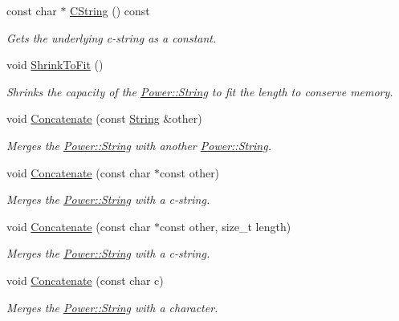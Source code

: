 \begin{DoxyCompactItemize}
const char $\ast$ \hyperlink{class_power_1_1_string_a8a0120f3e5dee6cb50be979f8b1175e4}{C\+String} () const
\begin{DoxyCompactList}\small\item\em Gets the underlying c-\/string as a constant. \end{DoxyCompactList}\item 
void \hyperlink{class_power_1_1_string_a5a787c065417773262c90e8da4e8e079}{Shrink\+To\+Fit} ()
\begin{DoxyCompactList}\small\item\em Shrinks the capacity of the \hyperlink{class_power_1_1_string}{Power\+::\+String} to fit the length to conserve memory. \end{DoxyCompactList}\item 
void \hyperlink{class_power_1_1_string_a06e6def1040275302b2ea78e6ceb05e6}{Concatenate} (const \hyperlink{class_power_1_1_string}{String} \&other)
\begin{DoxyCompactList}\small\item\em Merges the \hyperlink{class_power_1_1_string}{Power\+::\+String} with another \hyperlink{class_power_1_1_string}{Power\+::\+String}. \end{DoxyCompactList}\item 
void \hyperlink{class_power_1_1_string_aa8d8f7ef094a1057e5ab46742b42ad13}{Concatenate} (const char $\ast$const other)
\begin{DoxyCompactList}\small\item\em Merges the \hyperlink{class_power_1_1_string}{Power\+::\+String} with a c-\/string. \end{DoxyCompactList}\item 
void \hyperlink{class_power_1_1_string_aa21774f7245c99303be83b452735fe00}{Concatenate} (const char $\ast$const other, size\+\_\+t length)
\begin{DoxyCompactList}\small\item\em Merges the \hyperlink{class_power_1_1_string}{Power\+::\+String} with a c-\/string. \end{DoxyCompactList}\item 
void \hyperlink{class_power_1_1_string_ad5714c502a8ca25a8d3afbbf84590c63}{Concatenate} (const char c)
\begin{DoxyCompactList}\small\item\em Merges the \hyperlink{class_power_1_1_string}{Power\+::\+String} with a character. \end{DoxyCompactList}\item 

\end{DoxyCompactItemize}
